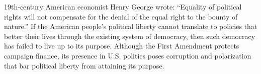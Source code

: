 \documentclass[12pt, a4paper, twoside]{article}
\begin{document}
19th-century American economist Henry George wrote: “Equality of political rights will not compensate for the denial of the equal right to the bounty of nature.” If the American people's political liberty cannot translate to policies that better their lives through the existing system of democracy, then such democracy has failed to live up to its purpose. Although the First Amendment protects campaign finance, its presence in U.S. politics poses corruption and polarization that bar political liberty from attaining its purpose. 

\nocite{*}
\printbibliography[title=References]
\end{document}
